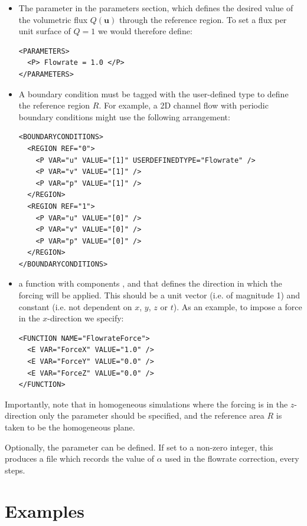 \begin{itemize}
  \item The  parameter in the parameters section, which defines
  the desired value of the volumetric flux $Q(\mathbf{u})$ through the reference
  region. To set a flux per unit surface of $Q = 1$ we would therefore define:
\begin{lstlisting}[style=XMLStyle]
<PARAMETERS>
  <P> Flowrate = 1.0 </P>
</PARAMETERS>
\end{lstlisting}
  \item A boundary condition must be tagged with the 
  user-defined type to define the reference region $R$. For example, a 2D
  channel flow with periodic boundary conditions might use the following
  arrangement:
\begin{lstlisting}[style=XMLStyle]
<BOUNDARYCONDITIONS>
  <REGION REF="0">
    <P VAR="u" VALUE="[1]" USERDEFINEDTYPE="Flowrate" />
    <P VAR="v" VALUE="[1]" />
    <P VAR="p" VALUE="[1]" />
  </REGION>
  <REGION REF="1">
    <P VAR="u" VALUE="[0]" />
    <P VAR="v" VALUE="[0]" />
    <P VAR="p" VALUE="[0]" />
  </REGION>
</BOUNDARYCONDITIONS>
\end{lstlisting}
  \item a  function with components ,
   and  that defines the direction in which the
  forcing will be applied. This should be a unit vector (i.e. of magnitude 1)
  and constant (i.e. not dependent on $x$, $y$, $z$ or $t$). As an example, to
  impose a force in the $x$-direction we specify:
\begin{lstlisting}[style=XMLStyle]
<FUNCTION NAME="FlowrateForce">
  <E VAR="ForceX" VALUE="1.0" />
  <E VAR="ForceY" VALUE="0.0" />
  <E VAR="ForceZ" VALUE="0.0" />
</FUNCTION>
\end{lstlisting}
\end{itemize}

Importantly, note that in homogeneous simulations where the forcing is in the
$z$-direction only the  parameter should be specified, and the
reference area $R$ is taken to be the homogeneous plane.

Optionally, the  parameter can be defined. If set to a
non-zero integer, this produces a file  which records the
value of $\alpha$ used in the flowrate correction, every 
steps.

\section{Examples}
\label{s:incns:examples}

